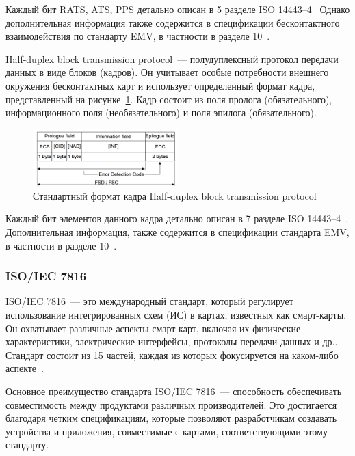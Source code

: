 Каждый бит RATS, ATS, PPS детально описан в 5 разделе ISO 14443--4~\cite{iso14443-4} Однако дополнительная информация также содержится в спецификации бесконтактного взаимодействия по стандарту EMV, в частности в разделе 10~\cite{emv_specifications_book}.

Half-duplex block transmission protocol~--- полудуплексный протокол передачи данных в виде блоков (кадров).
Он учитывает особые потребности внешнего окружения бесконтактных карт и использует определенный формат кадра, представленный на рисунке~\ref{fig:hd_block_format}.
Кадр состоит из поля пролога (обязательного), информационного поля (необязательного) и поля эпилога (обязательного).

\begin{figure}[H]
    \centering
    \includegraphics[width=0.5\textwidth]{images/research/hd_block_format}
    \caption{\centering Стандартный формат кадра Half-duplex block transmission protocol}
    \label{fig:hd_block_format}
\end{figure}

Каждый бит элементов данного кадра детально описан в 7 разделе ISO 14443--4~\cite{iso14443-4}.
Дополнительная информация, также содержится в спецификации стандарта EMV, в частности в разделе 10~\cite{emv_specifications_book}.


\subsubsection{ISO/IEC 7816}
\label{subsubsec:7816}

ISO/IEC 7816~--- это международный стандарт, который регулирует использование интегрированных схем (ИС) в картах, известных как смарт-карты.
Он охватывает различные аспекты смарт-карт, включая их физические характеристики, электрические интерфейсы, протоколы передачи данных и др..
Стандарт состоит из 15 частей, каждая из которых фокусируется на каком-либо аспекте~\cite{7816_wiki}.

Основное преимущество стандарта ISO/IEC 7816~--- способность обеспечивать совместимость между продуктами различных производителей.
Это достигается благодаря четким спецификациям, которые позволяют разработчикам создавать устройства и приложения, совместимые с картами, соответствующими этому стандарту.

